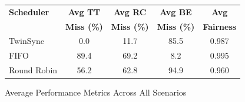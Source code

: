
\begin{figure}[!t]
\centering
\footnotesize
\begin{tabular}{@{}lcccc@{}}
\toprule
\textbf{Scheduler} & \textbf{Avg TT} & \textbf{Avg RC} & \textbf{Avg BE} & \textbf{Avg} \\
& \textbf{Miss (\%)} & \textbf{Miss (\%)} & \textbf{Miss (\%)} & \textbf{Fairness} \\
\midrule
TwinSync & 0.0 & 11.7 & 85.5 & 0.987 \\
FIFO & 89.4 & 69.2 & 8.2 & 0.995 \\
Round Robin & 56.2 & 62.8 & 94.9 & 0.960 \\
\bottomrule
\end{tabular}
\caption{Average Performance Metrics Across All Scenarios}
\label{fig:average_summary}
\vspace{-0.3cm}
\end{figure}
